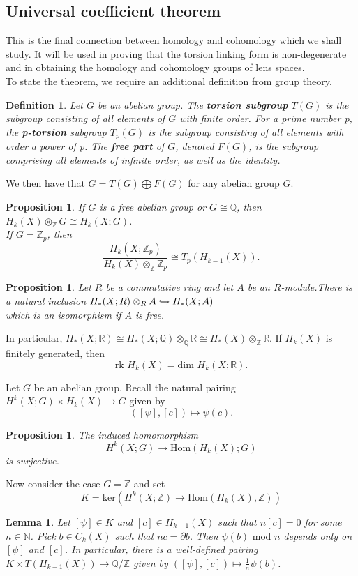 \documentclass{article}
\newtheorem{definition}[theorem]{Definition}
\newtheorem{lemma}[theorem]{Lemma}
\newtheorem{proposition}[theorem]{Proposition}
\begin{document}
\subsection{Universal coefficient theorem}
This is the final connection between homology and cohomology which we shall study. It will be used in proving that the torsion linking form is non-degenerate and in obtaining the homology and cohomology groups of lens spaces.\\
\noindent To state the theorem, we require an additional definition from group theory.

\begin{definition}
Let $G$ be an abelian group. The \textbf{torsion subgroup} $T(G)$ is the subgroup consisting of all elements of $G$ with finite order. For a prime number p, the \textbf{p-torsion} subgroup $T_p(G)$ is the subgroup consisting of all elements with order a power of p. The \textbf{free part} of $G$, denoted $F(G)$, is the subgroup comprising all elements of infinite order, as well as the identity.
\end{definition}

\noindent We then have that $G=T(G)\bigoplus F(G)$ for any abelian group $G$.

\begin{proposition}
If $G$ is a free abelian group or $G\cong\mathbb{Q}$, then $H_k(X)\otimes_\mathbb{Z}G\cong H_k(X;G)$.\\
If $G=\mathbb{Z}_p$, then \[\frac{H_k(X;\mathbb{Z}_p)}{H_k(X)\otimes_\mathbb{Z}\mathbb{Z}_p}\cong T_p(H_{k-1}(X)).\]
\end{proposition}

\begin{proposition}
Let $R$ be a commutative ring and let $A$ be an $R$-module.There is a natural inclusion $H_*(X;R)\otimes_RA\xhookrightarrow{}H_*(X;A)$\\
which is an isomorphism if $A$ is free.
\end{proposition}

In particular, $H_*(X;\mathbb{R})\cong H_*(X;\mathbb{Q})\otimes_\mathbb{Q}\mathbb{R}\cong H_*(X)\otimes_\mathbb{Z}\mathbb{R}$. If $H_k(X)$ is finitely generated, then \[\text{rk }H_k(X)=\text{dim }H_k(X;\mathbb{R}).\]

\noindent Let $G$ be an abelian group. Recall the natural pairing $H^k(X;G)\times H_k(X)\to G$ given by \[([\psi],[c])\mapsto\psi(c).\]

\begin{proposition}
The induced homomorphism \[H^k(X;G)\to\text{Hom}(H_k(X);G)\]is surjective.
\end{proposition}
\noindent Now consider the case $G=\mathbb{Z}$ and set\[K=\text{ker}(H^k(X;\mathbb{Z})\to\text{Hom}(H_k(X),\mathbb{Z}))\]
\begin{lemma}
Let $[\psi]\in K$ and $[c]\in H_{k-1}(X)$ such that $n[c]=0$ for some $n\in\mathbb{N}$. Pick $b\in C_k(X)$ such that $nc=\partial b$. Then $\psi(b)\text{ mod }n$ depends only on $[\psi]$ and $[c]$.
In particular, there is a well-defined pairing $K\times T(H_{k-1}(X))\to\mathbb{Q}/\mathbb{Z}$ given by $([\psi],[c])\mapsto\frac{1}{n}\psi(b)$.
\end{lemma}
\end{document}

